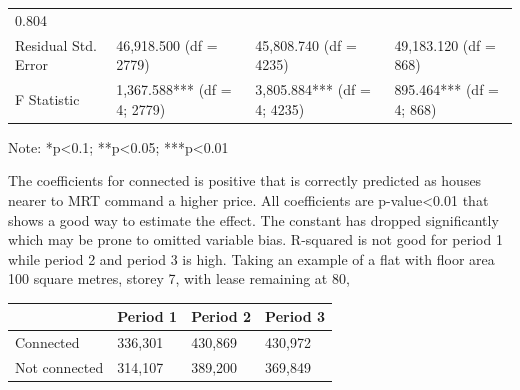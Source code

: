 \documentclass[]{book}
\begin{document}
\begin{longtable}[]{@{}llll@{}}
\begin{minipage}[t]{0.22\columnwidth}
0.804\strut
\end{minipage}\tabularnewline
\begin{minipage}[t]{0.18\columnwidth}\raggedright\strut
Residual Std. Error\strut
\end{minipage} & \begin{minipage}[t]{0.24\columnwidth}\raggedright\strut
46,918.500 (df = 2779)\strut
\end{minipage} & \begin{minipage}[t]{0.24\columnwidth}\raggedright\strut
45,808.740 (df = 4235)\strut
\end{minipage} & \begin{minipage}[t]{0.22\columnwidth}\raggedright\strut
49,183.120 (df = 868)\strut
\end{minipage}\tabularnewline
\begin{minipage}[t]{0.18\columnwidth}\raggedright\strut
F Statistic\strut
\end{minipage} & \begin{minipage}[t]{0.24\columnwidth}\raggedright\strut
1,367.588*** (df = 4; 2779)\strut
\end{minipage} & \begin{minipage}[t]{0.24\columnwidth}\raggedright\strut
3,805.884*** (df = 4; 4235)\strut
\end{minipage} & \begin{minipage}[t]{0.22\columnwidth}\raggedright\strut
895.464*** (df = 4; 868)\strut
\end{minipage}\tabularnewline
\bottomrule
\end{longtable}

Note: *p\textless{}0.1; **p\textless{}0.05; ***p\textless{}0.01

The coefficients for connected is positive that is correctly predicted
as houses nearer to MRT command a higher price. All coefficients are
p-value\textless{}0.01 that shows a good way to estimate the effect. The
constant has dropped significantly which may be prone to omitted
variable bias. R-squared is not good for period 1 while period 2 and
period 3 is high. Taking an example of a flat with floor area 100 square
metres, storey 7, with lease remaining at 80,

\begin{longtable}[]{@{}llll@{}}
\toprule
& Period 1 & Period 2 & Period 3\tabularnewline
\midrule
\endhead
Connected & 336,301 & 430,869 & 430,972\tabularnewline
Not connected & 314,107 & 389,200 & 369,849\tabularnewline
\bottomrule
\end{longtable}
\end{document}

